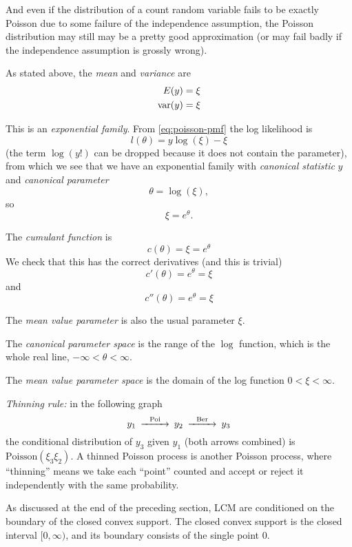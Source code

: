 And even if the distribution of a count random variable fails to be exactly
Poisson due to some failure of the independence assumption, the Poisson
distribution may still may be a pretty good approximation (or may fail badly
if the independence assumption is grossly wrong).

As stated above, the \emph{mean} and \emph{variance} are
\begin{align*}
   E(y) & = \xi
   \\
   \operatorname{var}(y) & = \xi
\end{align*}

This is an \emph{exponential family}.  From \eqref{eq:poisson-pmf}
the log likelihood is
$$
   l(\theta) = y \log(\xi) - \xi
$$
(the term $\log(y !)$ can be dropped because it does not contain the
parameter), from which we see that we have an exponential family with
\emph{canonical statistic} $y$ and \emph{canonical parameter}
$$
   \theta = \log(\xi),
$$
so
$$
   \xi = e^{\theta}.
$$

The \emph{cumulant function} is
$$
   c(\theta) = \xi = e^\theta
$$
We check that this has the correct derivatives (and this is trivial)
$$
   c'(\theta) = e^\theta = \xi
$$
and
$$
   c''(\theta) = e^\theta = \xi
$$

The \emph{mean value parameter} is also the usual parameter $\xi$.

The \emph{canonical parameter space} is the range of the $\log$ function,
which is the whole real line, $- \infty < \theta < \infty$.

\begin{sloppypar}
The \emph{mean value parameter space} is the domain of the log function
\mbox{$0 < \xi < \infty$}.
\end{sloppypar}

\begin{sloppypar}
\emph{Thinning rule:} in the following graph
$$
\begin{CD}
   y_1 @>\text{Poi}>> y_2 @>\text{Ber}>> y_3
\end{CD}
$$
the conditional distribution of $y_3$ given $y_1$ (both arrows combined)
is $\text{Poisson}(\xi_3 \xi_2)$.  A thinned Poisson process is another
Poisson process, where ``thinning'' means we take each ``point'' counted
and accept or reject it independently with the same probability.
\end{sloppypar}

As discussed at the end of the preceding section, LCM
are conditioned on the boundary of the closed convex support.
The closed convex support is the closed interval $[0, \infty)$, and its
boundary consists of the single point $0$.


